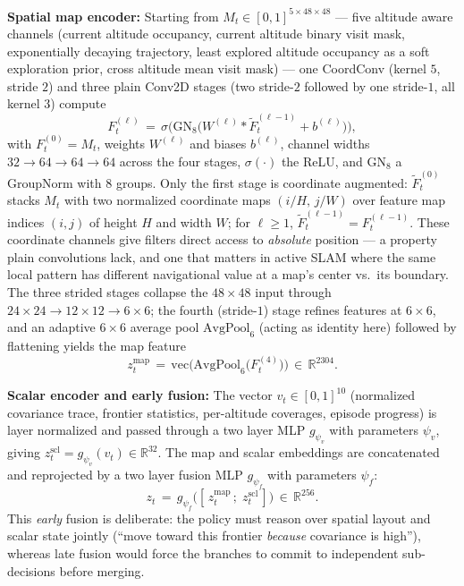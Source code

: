 \documentclass[conference]{IEEEtran}
\begin{document}
\textbf{Spatial map encoder:} Starting from $M_t\!\in\![0,1]^{5{\times}48{\times}48}$ --- five altitude aware channels (current altitude occupancy, current altitude binary visit mask, exponentially decaying trajectory, least explored altitude occupancy as a soft exploration prior, cross altitude mean visit mask) --- one CoordConv (kernel $5$, stride $2$) and three plain Conv2D stages (two stride-$2$ followed by one stride-$1$, all kernel $3$) compute
\begin{equation}
F^{(\ell)}_t \,=\, \sigma\big(\mathrm{GN}_8\big(W^{(\ell)}\!*\!\widetilde{F}^{(\ell-1)}_t + b^{(\ell)}\big)\big),
\label{eq:coordconv}
\end{equation}
with $F^{(0)}_t\!=\!M_t$, weights $W^{(\ell)}$ and biases $b^{(\ell)}$, channel widths $32\!\to\!64\!\to\!64\!\to\!64$ across the four stages, $\sigma(\cdot)$ the ReLU, and $\mathrm{GN}_8$ a GroupNorm with $8$ groups. Only the first stage is coordinate augmented: $\widetilde{F}^{(0)}_t$ stacks $M_t$ with two normalized coordinate maps $(i/H,\,j/W)$ over feature map indices $(i,j)$ of height $H$ and width $W$; for $\ell\!\geq\!1$, $\widetilde{F}^{(\ell-1)}_t\!=\!F^{(\ell-1)}_t$. These coordinate channels give filters direct access to \emph{absolute} position --- a property plain convolutions lack, and one that matters in active SLAM where the same local pattern has different navigational value at a map's center vs.\ its boundary. The three strided stages collapse the $48{\times}48$ input through $24{\times}24\!\to\!12{\times}12\!\to\!6{\times}6$; the fourth (stride-$1$) stage refines features at $6{\times}6$, and an adaptive $6{\times}6$ average pool $\mathrm{AvgPool}_{6}$ (acting as identity here) followed by flattening yields the map feature
\begin{equation}
z^{\text{map}}_t \,=\, \mathrm{vec}\big(\mathrm{AvgPool}_{6}\big(F^{(4)}_t\big)\big) \,\in\, \mathbb{R}^{2304}.
\label{eq:zmap}
\end{equation}

\textbf{Scalar encoder and early fusion:} The vector $v_t\!\in\![0,1]^{10}$ (normalized covariance trace, frontier statistics, per-altitude coverages, episode progress) is layer normalized and passed through a two layer MLP $g_{\psi_v}$ with parameters $\psi_v$, giving $z^{\text{scl}}_t\!=\!g_{\psi_v}(v_t)\!\in\!\mathbb{R}^{32}$. The map and scalar embeddings are concatenated and reprojected by a two layer fusion MLP $g_{\psi_f}$ with parameters $\psi_f$:
\begin{equation}
z_t \,=\, g_{\psi_f}\big([\,z^{\text{map}}_t\,;\;z^{\text{scl}}_t\,]\big) \,\in\, \mathbb{R}^{256}.
\label{eq:fuse}
\end{equation}
This \emph{early} fusion is deliberate: the policy must reason over spatial layout and scalar state jointly (``move toward this frontier \emph{because} covariance is high''), whereas late fusion would force the branches to commit to independent sub-decisions before merging.
\end{document}
